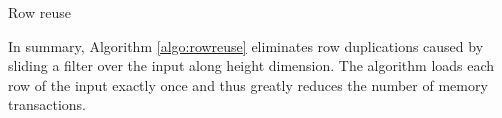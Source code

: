 \begin{algorithm}
	\caption{Row reuse}
	\label{algo:rowreuse}
\end{algorithm}

In summary, Algorithm \ref{algo:rowreuse} eliminates row duplications caused by sliding a filter over the input along height dimension. The
algorithm loads each row of the input exactly once and thus greatly reduces the number of memory transactions.

